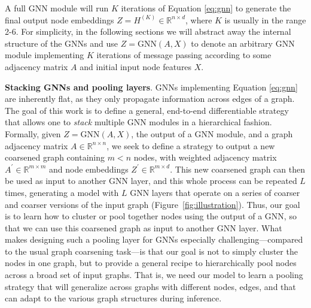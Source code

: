 \documentclass{article}
\newcommand{\xhdr}[1]{{\noindent\bfseries #1}.}
\newcommand{\gnn}{\textrm{GNN}}
\newcommand{\R}{\mathbb{R}}
\begin{document}
A full GNN module will run $K$ iterations of Equation \eqref{eq:gnn} to generate the final output node embeddings $Z=H^{(K)} \in \mathbb{R}^{n \times d}$, where $K$ is usually in the range 2-6.
For simplicity, in the following sections we will abstract away the internal structure of the GNNs and use $Z = \gnn(A, X)$ to denote an arbitrary GNN module implementing $K$ iterations of message passing according to some adjacency matrix $A$ and initial input node features $X$. 

\xhdr{Stacking GNNs and pooling layers}
GNNs implementing Equation \eqref{eq:gnn} are inherently flat, as they only propagate information across edges of a graph.
The goal of this work is to define a general, end-to-end differentiable strategy that allows one to {\em stack} multiple GNN modules in a hierarchical fashion. 
Formally, given $Z = \gnn(A, X)$, the output of a GNN module, and a graph adjacency matrix $A \in \mathbb{R}^{n \times n}$, we seek to define a strategy to output a new coarsened graph containing $m<n$ nodes, with weighted adjacency matrix $A^{'} \in \R^{m \times m}$ and node embeddings $Z^{'} \in \mathbb{R}^{m\times d}$.
This new coarsened graph can then be used as input to another GNN layer, and this whole process can be repeated $L$ times, generating a model with $L$ GNN layers that operate on a series of coarser and coarser versions of the input graph (Figure~\ref{fig:illustration}).
Thus, our goal is to learn how to cluster or pool together nodes using the output of a GNN, so that we can use this coarsened graph as input to another GNN layer.
What makes designing such a pooling layer for GNNs especially challenging---compared to the usual graph coarsening task---is that our goal is not to simply cluster the nodes in one graph, but to provide a general recipe to hierarchically pool nodes across a broad set of input graphs. 
That is, we need our model to learn a pooling strategy that will generalize across graphs with different nodes, edges, and that can adapt to the various graph structures during inference. 
\end{document}
